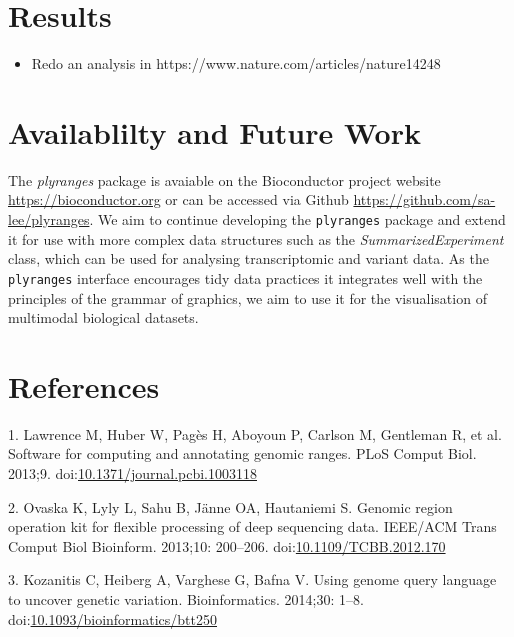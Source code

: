 \documentclass[10pt,letterpaper]{article}
\providecommand{\tightlist}{%
  \setlength{\itemsep}{0pt}\setlength{\parskip}{0pt}}
\begin{document}
\hypertarget{results}{%
\section{Results}\label{results}}

\begin{itemize}
\tightlist
\item
  Redo an analysis in https://www.nature.com/articles/nature14248
\end{itemize}

\hypertarget{availablilty-and-future-work}{%
\section{Availablilty and Future
Work}\label{availablilty-and-future-work}}

The \emph{plyranges} package is avaiable on the Bioconductor project
website \url{https://bioconductor.org} or can be accessed via Github
\url{https://github.com/sa-lee/plyranges}. We aim to continue developing
the \texttt{plyranges} package and extend it for use with more complex
data structures such as the \emph{SummarizedExperiment} class, which can
be used for analysing transcriptomic and variant data. As the
\texttt{plyranges} interface encourages tidy data practices it
integrates well with the principles of the grammar of graphics, we aim
to use it for the visualisation of multimodal biological datasets.

\hypertarget{references}{%
\section*{References}\label{references}}

\hypertarget{refs}{}
\leavevmode\hypertarget{ref-Lawrence2013-wg}{}%
1. Lawrence M, Huber W, Pagès H, Aboyoun P, Carlson M, Gentleman R, et
al. Software for computing and annotating genomic ranges. PLoS Comput
Biol. 2013;9.
doi:\href{https://doi.org/10.1371/journal.pcbi.1003118}{10.1371/journal.pcbi.1003118}

\leavevmode\hypertarget{ref-Ovaska2013-gd}{}%
2. Ovaska K, Lyly L, Sahu B, Jänne OA, Hautaniemi S. Genomic region
operation kit for flexible processing of deep sequencing data. IEEE/ACM
Trans Comput Biol Bioinform. 2013;10: 200--206.
doi:\href{https://doi.org/10.1109/TCBB.2012.170}{10.1109/TCBB.2012.170}

\leavevmode\hypertarget{ref-Kozanitis2014-va}{}%
3. Kozanitis C, Heiberg A, Varghese G, Bafna V. Using genome query
language to uncover genetic variation. Bioinformatics. 2014;30: 1--8.
doi:\href{https://doi.org/10.1093/bioinformatics/btt250}{10.1093/bioinformatics/btt250}
\end{document}
